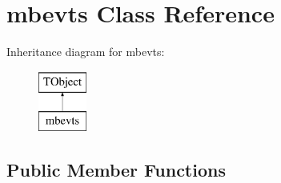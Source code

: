 \hypertarget{classmbevts}{\section{mbevts Class Reference}
\label{classmbevts}
}
Inheritance diagram for mbevts\-:\begin{figure}[H]
\begin{center}
\leavevmode
\includegraphics[height=2.000000cm]{classmbevts}
\end{center}
\end{figure}
\subsection*{Public Member Functions}
